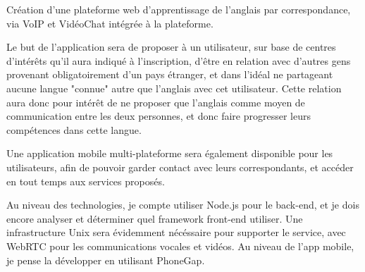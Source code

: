 Création d'une plateforme web d'apprentissage de l'anglais par correspondance, via VoIP et VidéoChat intégrée à la plateforme.

Le but de l'application sera de proposer à un utilisateur, sur base de centres d'intérêts qu'il aura indiqué à l'inscription, d'être en relation
avec d'autres gens provenant obligatoirement d'un pays étranger, et dans l'idéal ne partageant aucune langue "connue" autre que l'anglais avec cet utilisateur.
Cette relation aura donc pour intérêt de ne proposer que l'anglais comme moyen de communication entre les deux personnes, et donc faire progresser 
leurs compétences dans cette langue.

Une application mobile multi-plateforme sera également disponible pour les utilisateurs, afin de pouvoir garder contact avec leurs correspondants, 
et accéder en tout temps aux services proposés.

Au niveau des technologies, je compte utiliser Node.js pour le back-end, et je dois encore analyser et déterminer quel framework front-end utiliser.
Une infrastructure Unix sera évidemment nécéssaire pour supporter le service, avec WebRTC pour les communications vocales et vidéos.
Au niveau de l'app mobile, je pense la développer en utilisant PhoneGap.